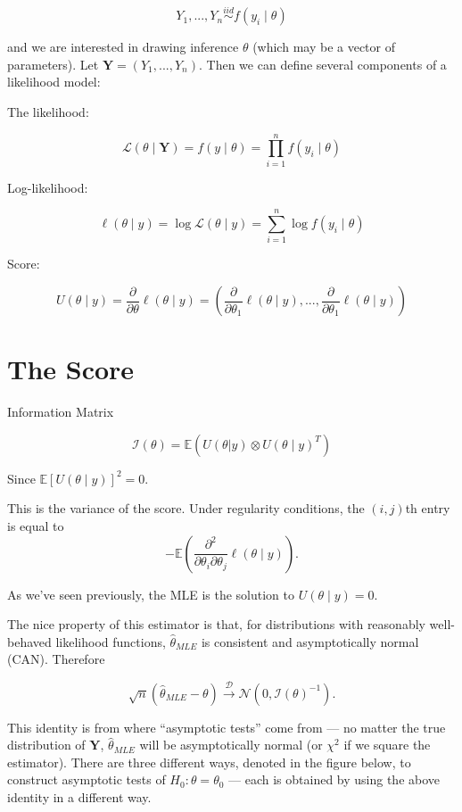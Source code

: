 \documentclass[
  letterpaper,
  DIV=11,
  numbers=noendperiod]{scrreport}
\begin{document}
\[Y_1, ..., Y_n \stackrel{iid}{\sim} f(y_i \mid \theta)\]

and we are interested in drawing inference \(\theta\) (which may be a
vector of parameters). Let \(\mathbf{Y} = (Y_1, ..., Y_n)\). Then we can
define several components of a likelihood model:

The likelihood:

\[\mathcal L(\theta \mid \mathbf{Y}) = f(y \mid \theta) = \prod_{i=1}^n f(y_i \mid \theta)\]

Log-likelihood:

\[\ell(\theta \mid y) = \log \mathcal L(\theta \mid y) = \sum_{i=1}^n \log f(y_i \mid \theta)\]

Score:

\[U(\theta \mid y) = \frac{\partial}{\partial \theta} \ell (\theta \mid y) = \left( \frac{\partial}{\partial \theta_1} \ell(\theta \mid y), ..., \frac{\partial}{\partial \theta_1} \ell(\theta \mid y) \right)\]

\hypertarget{the-score}{%
\section{The Score}\label{the-score}}

Information Matrix

\[\mathcal I(\theta) = \mathbb E( U(\theta | y) \otimes U(\theta \mid y)^T) \]

Since \(\mathbb E[U(\theta \mid y)]^2 = 0\).

This is the variance of the score. Under regularity conditions, the
\((i,j)\)th entry is equal to
\[- \mathbb E( \frac{\partial^2}{\partial \theta_i \partial \theta_j} \ell ( \theta \mid y)).\]

As we've seen previously, the MLE is the solution to
\(U(\theta \mid y) = 0\).

The nice property of this estimator is that, for distributions with
reasonably well-behaved likelihood functions, \(\hat \theta_{MLE}\) is
consistent and asymptotically normal (CAN). Therefore

\[\sqrt{n} (\hat \theta_{MLE} - \theta) \stackrel{\mathcal D}{\to} \mathcal N(0, \mathcal I(\theta)^{-1}).\]

This identity is from where ``asymptotic tests'' come from --- no matter
the true distribution of \(\mathbf Y\), \(\hat \theta_{MLE}\) will be
asymptotically normal (or \(\chi^2\) if we square the estimator). There
are three different ways, denoted in the figure below, to construct
asymptotic tests of \(H_0 : \theta = \theta_0\) --- each is obtained by
using the above identity in a different way.
\end{document}
